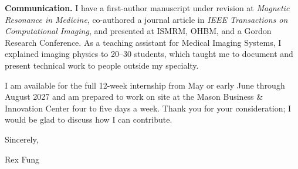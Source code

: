 \documentclass[11pt]{article}
\begin{document}
\textbf{Communication.} I have a first-author manuscript under revision at \textit{Magnetic Resonance in Medicine}, co-authored a journal article in \textit{IEEE Transactions on Computational Imaging}, and presented at ISMRM, OHBM, and a Gordon Research Conference. As a teaching assistant for Medical Imaging Systems, I explained imaging physics to 20--30 students, which taught me to document and present technical work to people outside my specialty.

I am available for the full 12-week internship from May or early June through August 2027 and am prepared to work on site at the Mason Business \& Innovation Center four to five days a week. Thank you for your consideration; I would be glad to discuss how I can contribute.

Sincerely,

Rex Fung
\end{document}
